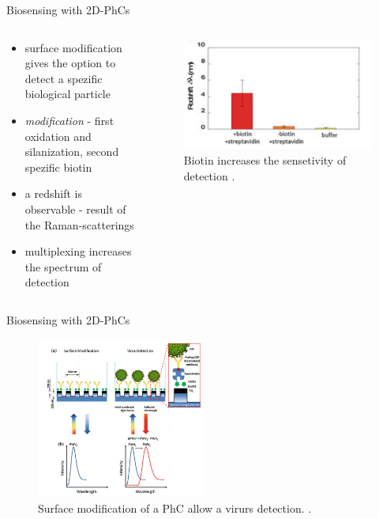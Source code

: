 \begin{frame}{Biosensing with 2D-PhCs}
  \begin{columns}

  \begin{column}{0.49\textwidth}
    \begin{itemize}
    \setlength\itemsep{1.2em}
    \item{ surface modification gives the option to detect a spezific biological particle}
    \item{ \emph{modification} - first oxidation and silanization, second spezific biotin}
    \item { a redshift is observable - result of the Raman-scatterings}
    \item{ multiplexing increases the spectrum of detection}
  \end{itemize}
  \end{column}

  \begin{column}{0.49\textwidth}
  \begin{figure}
    \centering
    \includegraphics[width=1\textwidth]{./bilder/biotin.png}
    \caption{Biotin increases the sensetivity of detection \cite{nano}.}
    \label{fig: redshift}
  \end{figure}
\end{column}
\end{columns}
\end{frame}
\begin{frame}{Biosensing with 2D-PhCs}
  \begin{figure}
    \centering
    \includegraphics[width=0.5\textwidth]{./bilder/reflektion.png}
    \caption{Surface modification of a PhC allow a virurs detection. \cite{nano}.}
    \label{fig: virus detection}
  \end{figure}

\end{frame}

